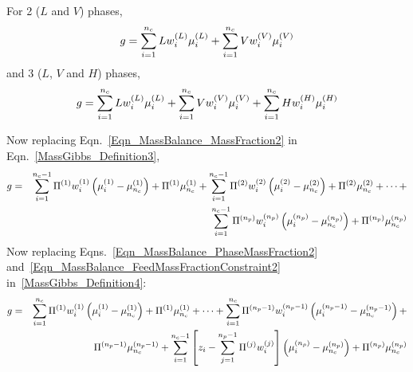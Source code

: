 \begin{shaded}\noindent
   For 2 ($L$ and $V$) phases,
     \begin{displaymath}
        g = \summation_{i=1}^{n_{c}}L\mfr[w]{i}{L}\mfr[\mu]{i}{L} + \summation_{i=1}^{n_{c}}V\mfr[w]{i}{V}\mfr[\mu]{i}{V}
     \end{displaymath}
     and 3 ($L$, $V$ and $H$) phases,
     \begin{displaymath}
       g = \summation_{i=1}^{n_{c}}L\mfr[w]{i}{L}\mfr[\mu]{i}{L} + \summation_{i=1}^{n_{c}}V\mfr[w]{i}{V}\mfr[\mu]{i}{V} + \summation_{i=1}^{n_{c}}H\mfr[w]{i}{H}\mfr[\mu]{i}{H}
     \end{displaymath}
\end{shaded}


Now replacing Eqn.~\ref{Eqn_MassBalance_MassFraction2} in Eqn.~\ref{MassGibbs_Definition3},
\begin{eqnarray}
g &=& \summation_{i=1}^{n_{c}-1}\Pi^{(1)}\mfr[w]{i}{1}\left(\mfr[\mu]{i}{1}-\mfr[\mu]{n_{c}}{1}\right) + \Pi^{(1)}\mfr[\mu]{n_{c}}{1} + \summation_{i=1}^{n_{c}-1}\Pi^{(2)}\mfr[w]{i}{2}\left(\mfr[\mu]{i}{2}-\mfr[\mu]{n_{c}}{2}\right) + \Pi^{(2)}\mfr[\mu]{n_{c}}{2} + \cdots + \nonumber \\
  && \summation_{i=1}^{n_{c}-1}\mfr[\Pi]{}{n_{p}}\mfr[w]{i}{n_{p}}\left(\mfr[\mu]{i}{n_{p}}-\mfr[\mu]{n_{c}}{n_{p}}\right) + \mfr[\Pi]{}{n_{p}}\mfr[\mu]{n_{c}}{n_{p}}
\label{MassGibbs_Definition4}
\end{eqnarray}
Now replacing Eqns.~\ref{Eqn_MassBalance_PhaseMassFraction2} and~\ref{Eqn_MassBalance_FeedMassFractionConstraint2} in~\ref{MassGibbs_Definition4}:
\begin{eqnarray}
g &=& \summation_{i=1}^{n_{c}}\Pi^{(1)}\mfr[w]{i}{1}\left(\mfr[\mu]{i}{1}-\mfr[\mu]{n_{c}}{1}\right) + \Pi^{(1)}\mfr[\mu]{n_{c}}{1} + \cdots + \summation_{i=1}^{n_{c}}\mfr[\Pi]{}{n_{p}-1}\mfr[w]{i}{n_{p}-1}\left(\mfr[\mu]{i}{n_{p}-1}-\mfr[\mu]{n_{c}}{n_{p}-1}\right) +  \nonumber \\
   && \mfr[\Pi]{}{n_{p}-1}\mfr[\mu]{n_{c}}{n_{p}-1} + \summation_{i=1}^{n_{c}-1}\left[z_{i} - \summation_{j=1}^{n_{p}-1}\mfr[\Pi]{}{j}\mfr[w]{i}{j}\right]\left(\mfr[\mu]{i}{n_{p}}-\mfr[\mu]{n_{c}}{n_{p}}\right) + \mfr[\Pi]{}{n_{p}}\mfr[\mu]{n_{c}}{n_{p}}\nonumber
\end{eqnarray}

